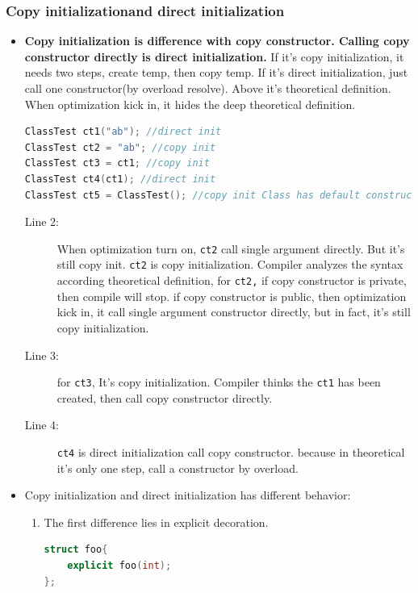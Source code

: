 \documentclass[a4paper,11pt,twoside]{book}
\begin{document}
\subsubsection{Copy initializationand direct initialization}
\begin{itemize}

	\item \textbf{Copy initialization is difference with copy constructor. Calling copy constructor directly is direct initialization.} If it's copy initialization, it needs two steps, create temp, then copy temp.  If it's direct initialization, just call one constructor(by overload resolve). Above it's theoretical definition. When optimization kick in, it hides the deep theoretical definition.
	
\begin{lstlisting}[frame=single, language=c++]
ClassTest ct1("ab"); //direct init
ClassTest ct2 = "ab"; //copy init 
ClassTest ct3 = ct1; //copy init
ClassTest ct4(ct1); //direct init
ClassTest ct5 = ClassTest(); //copy init Class has default constructor
\end{lstlisting}
\begin{description}
	\item[Line 2:]  When optimization turn on, \texttt{ct2} call single argument directly. But it's still copy init. \texttt{ct2} is copy initialization. Compiler analyzes the syntax according theoretical definition, for \texttt{ct2,} if copy constructor is private, then compile will stop. if copy constructor is public, then optimization kick in, it call single argument constructor directly, but in fact, it's still copy initialization.
	
	\item[Line 3:] for \texttt{ct3}, It's copy initialization. Compiler thinks the \texttt{ct1} has been created, then call copy constructor directly. 
	
	\item[Line 4:] \texttt{ct4} is direct initialization call copy constructor. because in theoretical it's only one step, call a constructor by overload. 
	
\end{description}

	\item Copy initialization and direct initialization has different behavior:
	\begin{enumerate}
		\item The first difference lies in explicit decoration.
\begin{lstlisting}[frame=single, language=c++]
struct foo{
	explicit foo(int);
};


\end{lstlisting}
\end{enumerate}
\end{itemize}
\end{document}
